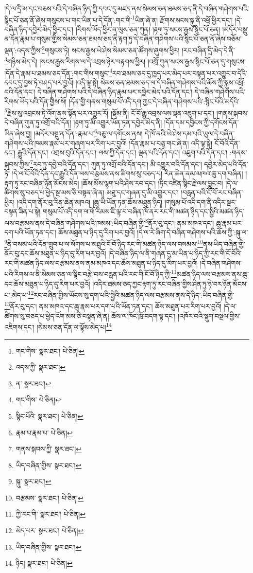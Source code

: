 །དེ་ལ་དྲི་མ་དང་བཅས་པའི་དེ་བཞིན་ཉིད་ཀྱི་དབང་དུ་མཛད་ནས་སེམས་ཅན་ཐམས་ཅད་ནི་དེ་བཞིན་གཤེགས་པའི་སྙིང་པོ་ཅན་ནོ་ཞེས་གསུངས་པ་གང་ཡིན་པ་དེ་དོན་:གང་གི་\footnote{གང་གིས་  སྣར་ཐང་།  པེ་ཅིན། }ཡིན་ཞེ་ན། རྫོགས་སངས་སྐུ་ནི་འཕྲོ་ཕྱིར་དང་། །དེ་བཞིན་ཉིད་དབྱེར་མེད་ཕྱིར་དང་། །རིགས་ཡོད་ཕྱིར་ན་ལུས་ཅན་ཀུན། །རྟག་ཏུ་སངས་རྒྱས་སྙིང་པོ་ཅན། །མདོར་བསྡུ་ན་དོན་རྣམ་པ་གསུམ་གྱིས་སེམས་ཅན་ཐམས་ཅད་ནི་རྟག་ཏུ་དེ་བཞིན་གཤེགས་པའི་སྙིང་པོ་ཅན་ནོ་ཞེས་བཅོམ་ལྡན་:འདས་ཀྱིས་\footnote{འདས་ཀྱི་  སྣར་ཐང་། }གསུངས་ཏེ། སངས་རྒྱས་ཡེ་ཤེས་སེམས་ཅན་ཚོགས་ཞུགས་ཕྱིར། །རང་བཞིན་དྲི་མེད་དེ་ནི་\footnote{ན་  སྣར་ཐང་། }གཉིས་མེད་དེ། །སངས་རྒྱས་རིགས་ལ་དེ་འབྲས་ཉེར་བརྟགས་ཕྱིར། །འགྲོ་ཀུན་སངས་རྒྱས་སྙིང་པོ་ཅན་དུ་གསུངས། །དོན་དེ་རྣམ་པ་ཐམས་ཅད་དོན་:གང་གིས་གསུང་\footnote{གང་གིས་  པེ་ཅིན། }རབ་ཐམས་ཅད་དུ་ཁྱད་པར་མེད་པར་བསྟན་པར་འགྱུར་བ་དེའི་དབང་དུ་བྱས་ཏེ་བཤད་པར་བྱའོ། །འདི་ལྟ་སྟེ། སེམས་ཅན་ཐམས་ཅད་ལ་དེ་བཞིན་གཤེགས་པའི་ཆོས་ཀྱི་སྐུས་འཕྲོ་བའི་དོན་དང་། དེ་བཞིན་གཤེགས་པའི་དེ་བཞིན་ཉིད་རྣམ་པར་དབྱེར་མེད་པའི་དོན་དང་། དེ་བཞིན་གཤེགས་པའི་རིགས་ཡོད་པའི་དོན་གྱིས་སོ། །དོན་གྱི་གནས་གསུམ་པོ་འདི་དག་ཀྱང་དེ་བཞིན་གཤེགས་པའི་:སྙིང་པོའི་མདོའི་\footnote{སྙིང་པོའི་  སྣར་ཐང་།  པེ་ཅིན། }རྗེས་སུ་འབྲངས་ཏེ་འོག་ནས་སྟོན་པར་འགྱུར་རོ། །སྡོམ་ནི། ངོ་བོ་རྒྱུ་འབྲས་ལས་ལྡན་འཇུག་པ་དང་། །གནས་སྐབས་དེ་བཞིན་ཀུན་ཏུ་འགྲོ་བའི་དོན། །རྟག་ཏུ་མི་འགྱུར་ཡོན་ཏན་དབྱེར་མེད་ནི། །དོན་དམ་དབྱིངས་ཀྱི་དགོངས་དོན་ཡིན་ཞེས་བྱ། །མདོར་བསྡུ་ན་དོན་:རྣམ་པ་\footnote{རྣམ་པ་རྣམ་པ་  པེ་ཅིན། }བཅུ་ལ་དགོངས་ནས། དེ་ཁོ་ནའི་ཡེ་ཤེས་དམ་པའི་ཡུལ་དེ་བཞིན་གཤེགས་པའི་ཁམས་རྣམ་པར་གཞག་པར་རིག་པར་བྱའོ། །དོན་རྣམ་པ་བཅུ་གང་ཞེ་ན། འདི་ལྟ་སྟེ། ངོ་བོའི་དོན་དང་། རྒྱུའི་དོན་དང་། འབྲས་བུའི་དོན་དང་། ལས་ཀྱི་དོན་དང་། ལྡན་པའི་དོན་དང་། འཇུག་པའི་དོན་དང་། :གནས་སྐབས་ཀྱིས་\footnote{གནས་སྐབས་ཀྱི་  སྣར་ཐང་། }རབ་ཏུ་དབྱེ་བའི་དོན་དང་། ཀུན་ཏུ་འགྲོ་བའི་དོན་དང་། མི་འགྱུར་བའི་དོན་དང་། དབྱེར་མེད་པའི་དོན་ཏོ། །དེ་ལ་ངོ་བོའི་དོན་དང་རྒྱུའི་དོན་ལས་བརྩམས་ནས་ཚིགས་སུ་བཅད་པ། རིན་ཆེན་ནམ་མཁའ་ཆུ་དག་བཞིན། །རྟག་ཏུ་རང་བཞིན་ཉོན་མོངས་མེད། །ཆོས་མོས་ལྷག་པའི་ཤེས་རབ་དང་། །ཏིང་འཛིན་སྙིང་རྗེ་ལས་བྱུང་བ། །དེ་ལ་ཚིགས་སུ་བཅད་པ་ཕྱེད་སྔ་མས་ཅི་བསྟན་ཞེ་ན། མཐུ་དང་གཞན་དུ་མི་འགྱུར་དང་། །བརླན་པའི་ངོ་བོ་རང་བཞིན་ཕྱིར། །འདི་དག་ནོར་བུ་རིན་ཆེན་མཁའ། །ཆུ་ཡི་ཡོན་ཏན་ཆོས་མཐུན་ཉིད། །གསུམ་པོ་འདི་དག་ནི་འདིར་སྔར་བསྟན་ཟིན་པ་སྟེ། གསུམ་པོ་འདི་དག་ལ་གོ་རིམས་ཇི་ལྟ་བ་བཞིན་ཁོ་ནར་རང་གི་མཚན་ཉིད་དང་སྤྱིའི་མཚན་ཉིད་ལས་བརྩམས་ནས་དེ་བཞིན་གཤེགས་པའི་ཁམས་:ཡིད་བཞིན་གྱི་\footnote{ཡིད་བཞིན་གྱིས་  སྣར་ཐང་། }ནོར་བུ་དང་། ནམ་མཁའ་དང་། ཆུ་རྣམ་པར་དག་པའི་ཡོན་ཏན་དང་། ཆོས་མཐུན་པ་ཉིད་དུ་རིག་པར་བྱའོ། །དེ་ལ་རེ་ཞིག་དེ་བཞིན་གཤེགས་པའི་ཆོས་ཀྱི་:སྐུ་ལ་\footnote{སྐུ་  སྣར་ཐང་། }ནི་བསམ་པའི་དོན་གྲུབ་པ་ལ་སོགས་པ་མཐུའི་ངོ་བོ་ཉིད་རང་གི་མཚན་ཉིད་ལས་བསམས་\footnote{བརྩམས་  སྣར་ཐང་།  པེ་ཅིན། }ནས་ཡིད་བཞིན་གྱི་ནོར་བུ་དང་ཆོས་མཐུན་པ་ཉིད་དུ་རིག་པར་བྱའོ། །དེ་བཞིན་ཉིད་ལ་ནི་གཞན་དུ་མ་ཡིན་པ་ཉིད་ཀྱི་རང་གི་ངོ་བོའི་རང་གི་མཚན་ཉིད་ལས་བརྩམས་ནས་ནམ་མཁའ་དང་ཆོས་མཐུན་པ་ཉིད་དུ་རིག་པར་བྱའོ། །དེ་བཞིན་གཤེགས་པའི་རིགས་ལ་ནི་སེམས་ཅན་ལ་སྙིང་བརྩེ་བས་བརླན་པའི་རང་གི་ངོ་བོ་ཉིད་ཀྱི་\footnote{ཀྱི་རང་གི་  སྣར་ཐང་།  པེ་ཅིན། }མཚན་ཉིད་ལས་བརྩམས་ནས་ཆུ་དང་ཆོས་མཐུན་པ་ཉིད་དུ་རིག་པར་བྱའོ། །འདིར་ཐམས་ཅད་ཀྱང་རྟག་ཏུ་རང་བཞིན་གྱིས་ཤིན་ཏུ་ཉེ་བར་ཉོན་མོངས་པ་:མེད་པ་\footnote{མེད་པར་  སྣར་ཐང་།  པེ་ཅིན། }རང་བཞིན་གྱིས་ཡོངས་སུ་དག་པའི་སྤྱིའི་མཚན་ཉིད་ལས་བརྩམས་ནས་དེ་ཉིད་:ཡིད་བཞིན་གྱི་\footnote{ཡིད་བཞིན་གྱིས་  སྣར་ཐང་། }ནོར་བུ་དང་། ནམ་མཁའ་དང་ཆུ་རྣམ་པར་དག་པའི་ཡོན་ཏན་དང་། ཆོས་མཐུན་པར་རིག་པར་བྱའོ། །དེ་ལ་ཚིགས་སུ་བཅད་པ་ཕྱེད་འོག་མས་ཅི་བསྟན་ཞེ་ན། ཆོས་ལ་ཁོང་ཁྲོ་བདག་ལྟ་དང་། །འཁོར་བའི་སྡུག་བསྔལ་གྱིས་འཇིགས་དང་། །སེམས་ཅན་དོན་ལ་ལྟོས་མེད་པ།\footnote{ཉིད།  སྣར་ཐང་།  པེ་ཅིན། } 